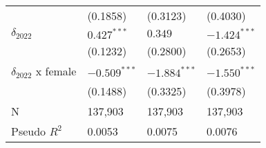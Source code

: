 \begin{tabular}{llll}
                           &           (0.1858) &           (0.3123) &           (0.4030) \\
$\delta_{2022}$            &      $0.427^{***}$ &            $0.349$ &     $-1.424^{***}$ \\
                           &           (0.1232) &           (0.2800) &           (0.2653) \\
$\delta_{2022}$ x female   &     $-0.509^{***}$ &     $-1.884^{***}$ &     $-1.550^{***}$ \\
                           &           (0.1488) &           (0.3325) &           (0.3978) \\
N                          &            137,903 &            137,903 &            137,903 \\
Pseudo $R^2$               &             0.0053 &             0.0075 &             0.0076 \\
\bottomrule
\end{tabular}
